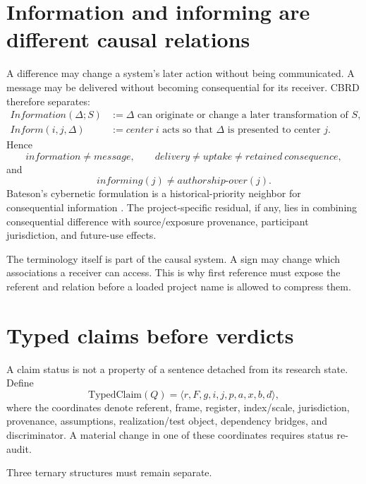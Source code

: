 \section{Information and informing are different causal relations}
\label{sec:cbrd-information}

A difference may change a system's later action without being communicated. A message may be delivered without becoming consequential for its receiver. CBRD therefore separates:
\begin{align}
Information(\Delta;S)
&:= \Delta\text{ can originate or change a later transformation of }S,\\
Inform(i,j,\Delta)
&:= center\ i\text{ acts so that }\Delta\text{ is presented to center }j.
\end{align}
Hence
\begin{equation}
information\neq message,\qquad
delivery\neq uptake\neq retained\ consequence,
\end{equation}
and
\begin{equation}
informing(j)\neq authorship\text{-}over(j).
\end{equation}
Bateson's cybernetic formulation is a historical-priority neighbor for consequential information \cite{Bateson1972}. The project-specific residual, if any, lies in combining consequential difference with source/exposure provenance, participant jurisdiction, and future-use effects.

The terminology itself is part of the causal system. A sign may change which associations a receiver can access. This is why first reference must expose the referent and relation before a loaded project name is allowed to compress them.

\section{Typed claims before verdicts}

A claim status is not a property of a sentence detached from its research state. Define
\begin{equation}
\mathrm{TypedClaim}(Q)=\langle r,F,g,i,j,p,a,x,b,d\rangle,
\end{equation}
where the coordinates denote referent, frame, register, index/scale, jurisdiction, provenance, assumptions, realization/test object, dependency bridges, and discriminator. A material change in one of these coordinates requires status re-audit.

Three ternary structures must remain separate.

